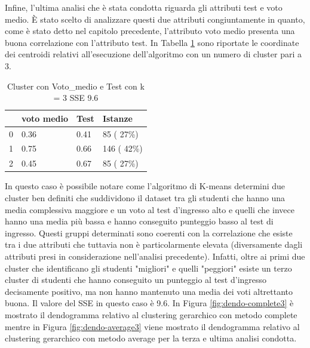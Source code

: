 \documentclass[12pt]{article}
\begin{document}
Infine, l'ultima analisi che è stata condotta riguarda gli attributi test e voto medio. È stato scelto di analizzare 
questi due attributi congiuntamente in quanto, come è stato detto nel capitolo precedente, l'attributo voto medio 
presenta una buona correlazione con l'attributo test. 
In Tabella \ref{c3MT} sono riportate le coordinate dei centroidi relativi all'esecuzione dell'algoritmo con un numero di cluster pari a 3.
\begin{table}[ht]
	\centering
	\begin{tabular}{@{}llll@{}}
	\toprule
	  & voto medio & Test  & Istanze\\ \midrule
	0 & 0.36       & 0.41  & 85  ( 27\%)\\
	1 & 0.75       & 0.66  & 146 ( 42\%)\\
	2 & 0.45       & 0.67  & 85  ( 27\%)\\ \bottomrule
	\end{tabular}
	\caption{Cluster con Voto\_medio e Test con k = 3 SSE 9.6}
	\label{c3MT}
\end{table}
In questo caso è possibile notare come
l'algoritmo di K-means determini due cluster ben definiti che suddividono il dataset tra gli studenti che hanno una
media complessiva maggiore e un voto al test d'ingresso alto e quelli che invece hanno una media più bassa e 
hanno conseguito punteggio basso al test di ingresso. Questi gruppi determinati sono coerenti con la correlazione 
che esiste tra i due attributi che tuttavia non è particolarmente elevata (diversamente dagli attributi presi in 
considerazione nell'analisi precedente). Infatti, oltre ai primi due cluster che identificano gli studenti "migliori"
e quelli "peggiori" esiste un terzo cluster di studenti che hanno conseguito un punteggio al test d'ingresso decisamente
positivo, ma non hanno mantenuto una media dei voti altrettanto buona. Il valore del SSE in questo caso è 9.6. In Figura \ref{fig:dendo-complete3} è mostrato il dendogramma relativo al clustering gerarchico con metodo complete mentre in Figura \ref{fig:dendo-average3} viene mostrato il dendogramma relativo al clustering gerarchico con metodo average per la terza e ultima analisi condotta.
\end{document}
